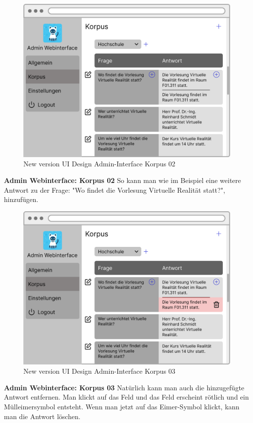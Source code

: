 \begin{figure}[H]
    \centering
    \includegraphics[width=1.0\textwidth]{bilder/new vers. UI Design/Korpus/Admin Interface 02.png}
    \caption{New version UI Design Admin-Interface Korpus 02}
    \label{fig:New version UI Design Admin-Interface Korpus 02}
\end{figure}
\noindent \textbf{Admin Webinterface: Korpus 02} \newline
So kann man wie im Beispiel eine weitere Antwort zu der Frage: "Wo findet die Vorlesung Virtuelle
Realität statt?", hinzufügen.

\begin{figure}[H]
    \centering
    \includegraphics[width=1.0\textwidth]{bilder/new vers. UI Design/Korpus/Admin Interface 03.png}
    \caption{New version UI Design Admin-Interface Korpus 03}
    \label{fig:New version UI Design Admin-Interface Korpus 03}
\end{figure}
\noindent \textbf{Admin Webinterface: Korpus 03} \newline
Natürlich kann man auch die hinzugefügte Antwort entfernen. Man klickt auf das Feld und das Feld erscheint rötlich und ein
Mülleimersymbol entsteht. Wenn man jetzt auf das Eimer-Symbol klickt, kann man die
Antwort löschen.

